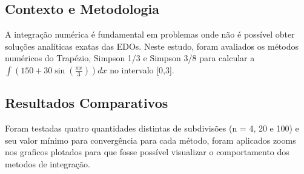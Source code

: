 \documentclass{article}
\begin{document}
\subsection*{Contexto e Metodologia}

A integração numérica é fundamental em problemas onde não é possível obter soluções analíticas exatas das EDOs. Neste estudo, foram avaliados os métodos numéricos do Trapézio, Simpson 1/3 e Simpson 3/8 para calcular a $\int \left(150 + 30\sin\left(\frac{{\pi x}}{{3}}\right)\right) dx$ no intervalo [0,3].

\subsection*{Resultados Comparativos}
Foram testadas quatro quantidades distintas de subdivisões (n = 4, 20 e 100) e seu valor mínimo para convergência para cada método, foram aplicados zooms nos graficos plotados para que fosse possível visualizar o comportamento dos metodos de integração.
\end{document}
